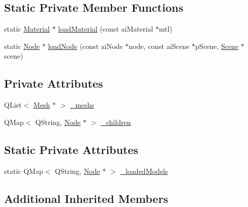\subsection*{Static Private Member Functions}
\begin{DoxyCompactItemize}
\item 
static \hyperlink{class_material}{Material} $\ast$ \hyperlink{class_node_a0684a35524cc1e276bfefdd28cd452cf}{load\+Material} (const ai\+Material $\ast$mtl)
\item 
static \hyperlink{class_node}{Node} $\ast$ \hyperlink{class_node_acf6db74c5840b203f4eee1239539ce31}{load\+Node} (const ai\+Node $\ast$node, const ai\+Scene $\ast$p\+Scene, \hyperlink{class_scene}{Scene} $\ast$scene)
\end{DoxyCompactItemize}
\subsection*{Private Attributes}
\begin{DoxyCompactItemize}
\item 
Q\+List$<$ \hyperlink{class_mesh}{Mesh} $\ast$ $>$ \hyperlink{class_node_aad5e459a1ed03d6e09ad7054f2014f5a}{\+\_\+meshs}
\item 
Q\+Map$<$ Q\+String, \hyperlink{class_node}{Node} $\ast$ $>$ \hyperlink{class_node_aac0c3b4b1f41b26ec5a22d77f067ec5b}{\+\_\+children}
\end{DoxyCompactItemize}
\subsection*{Static Private Attributes}
\begin{DoxyCompactItemize}
\item 
static Q\+Map$<$ Q\+String, \hyperlink{class_node}{Node} $\ast$ $>$ \hyperlink{class_node_a082b475f17808deeb73c07d311f45073}{\+\_\+loaded\+Models}
\end{DoxyCompactItemize}
\subsection*{Additional Inherited Members}



